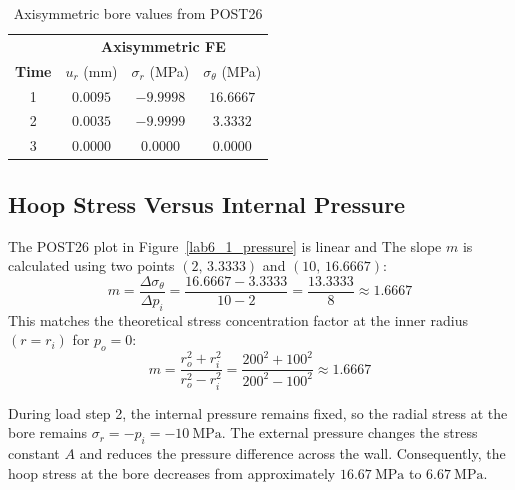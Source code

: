 \begin{table}[h!]
\caption{Axisymmetric bore values from POST26}
\label{tab1}
\centering
\begin{tabular}{c|ccc}
\toprule
& \multicolumn{3}{c}{\textbf{Axisymmetric FE}} \\ %
\textbf{Time} & $u_r$ (mm) & $\sigma_r$ (MPa) & $\sigma_\theta$ (MPa) \\ %
\midrule
1 & $0.0095$ & $-9.9998$ & $16.6667$ \\ %
2 & $0.0035$ & $-9.9999$ & $3.3332$ \\ %
3 & $0.0000$ & $0.0000$ & $0.0000$ \\ %
\bottomrule
\end{tabular}
\end{table}



\subsection{Hoop Stress Versus Internal Pressure}

The POST26 plot in
Figure~\ref{lab6_1_pressure} is linear and The slope $m$ is calculated using two points $(2,\, 3.3333)$ and $(10,\, 16.6667)$:
\[
m = \frac{\Delta \sigma_\theta}{\Delta p_i} = \frac{16.6667 - 3.3333}{10 - 2} = \frac{13.3333}{8} \approx 1.6667
\]
This matches the theoretical stress concentration factor at the inner radius$(r = r_i)$ for $p_o = 0$:
\[
m = \frac{r_o^2 + r_i^2}{r_o^2 - r_i^2} = \frac{200^2 + 100^2}{200^2 - 100^2}  \approx 1.6667
\]




During load step 2, the internal pressure remains fixed, so the radial stress
at the bore remains $\sigma_r=-p_i=-\SI{10}{\mega\pascal}$.  The external
pressure changes the stress constant $A$ and reduces the pressure difference
across the wall.  Consequently, the hoop stress at the bore decreases from
approximately $\SI{16.67}{\mega\pascal}$ to $\SI{6.67}{\mega\pascal}$.

